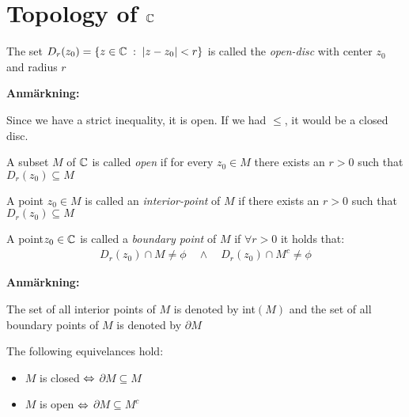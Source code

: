 \section{Topology of $\mathbb{C}$}
\par\bigskip
\begin{theo}{}
  The set $D_r(z_0) = \left\{z\in\mathbb{C}\;:\;\left|z-z_0\right|<r\right\}$ is called the \textit{open-disc} with center $z_0$ and radius $r$
\end{theo}
\par\bigskip
\noindent\textbf{Anmärkning:}\par
\noindent Since we have a strict inequality, it is open. If we had $\leq$, it would be a closed disc.
\par\bigskip
\begin{theo}{}
  A subset $M$ of $\mathbb{C}$ is called \textit{open} if for every $z_0\in M$ there exists an $r>0$ such that $D_r(z_0)\subseteq M$
\end{theo}
\par\bigskip
\begin{theo}{}
  A point $z_0\in M$ is called an \textit{interior-point} of $M$ if there exists an $r>0$ such that $D_r(z_0)\subseteq M$
\end{theo}
\par\bigskip
\begin{theo}{}
  A point$z_0\in\mathbb{C}$ is called a \textit{boundary point} of $M$ if $\forall r>0$ it holds that:
  \begin{equation*}
    \begin{gathered}
      D_r(z_0)\cap M\neq\phi\quad\wedge \quad D_r(z_0)\cap M^c\neq\phi
    \end{gathered}
  \end{equation*}
\end{theo}
\par\bigskip
\noindent\textbf{Anmärkning:}\par
\noindent The set of all interior points of $M$ is denoted by int$(M)$ and the set of all boundary points of $M$  is denoted by $\partial M$
\par\bigskip
\noindent The following equivelances hold:\par
\begin{itemize}
  \item $M$ is closed $\Leftrightarrow$ $\partial M\subseteq M$
  \item $M$ is open $\Leftrightarrow$ $\partial M\subseteq M^c$
\end{itemize}
